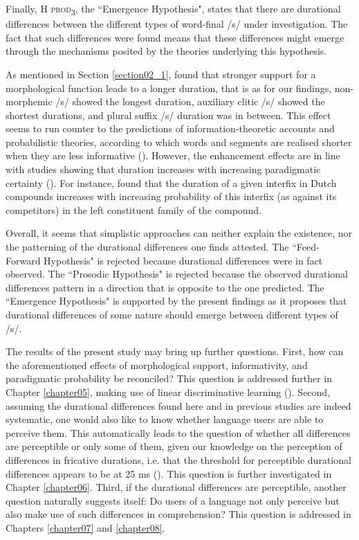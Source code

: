 Finally, \textsc{H prod\textsubscript{3}}, the ``Emergence Hypothesis", states that there are durational differences between the different types of word-final /s/ under investigation. The fact that such differences were found means that these differences might emerge through the mechanisms posited by the theories underlying this hypothesis. 

As mentioned in Section \ref{section02_1}, \citet{Tomaschek2019} found that stronger support for a morphological function leads to a longer duration, that is as for our findings, non-morphemic /s/ showed the longest duration, auxiliary clitic /s/ showed the shortest durations, and plural suffix /s/ duration was in between. This effect seems to run counter to the predictions of information-theoretic accounts and probabilistic theories, according to which words and segments are realised shorter when they are less informative (\cite{Aylett2004,Jaeger2010,Priva2015}). However, the enhancement effects are in line with studies showing that duration increases with increasing paradigmatic certainty (\cite{Kuperman2007, Cohen2014, Bell2021, Tucker2019Sims}). For instance, \citet{Kuperman2007} found that the duration of a given interfix in Dutch compounds increases with increasing probability of this interfix (as against its competitors) in the left constituent family of the compound. 

Overall, it seems that simplistic approaches can neither explain the existence, nor the patterning of the durational differences one finds attested. The ``Feed-Forward Hypothesis" is rejected because durational differences were in fact observed. The ``Prosodic Hypothesis" is rejected because the observed durational differences pattern in a direction that is opposite to the one predicted. The ``Emergence Hypothesis" is supported by the present findings as it proposes that durational differences of some nature should emerge between different types of /s/.

The results of the present study may bring up further questions. First, how can the aforementioned effects of morphological support, informativity, and paradigmatic probability be reconciled? This question is addressed further in Chapter \ref{chapter05}, making use of linear discriminative learning (\cite{Baayen2019, Chuang2021}). Second, assuming the durational differences found here and in previous studies are indeed systematic, one would also like to know whether language users are able to perceive them. This automatically leads to the question of whether all differences are perceptible or only some of them, given our knowledge on the perception of differences in fricative durations, i.e. that the threshold for perceptible durational differences appears to be at 25 ms (\cite{Klatt1975}). This question is further investigated in Chapter \ref{chapter06}. Third, if the durational differences are perceptible, another question naturally suggests itself: Do users of a language not only perceive but also make use of such differences in comprehension? This question is addressed in Chapters \ref{chapter07} and \ref{chapter08}.

